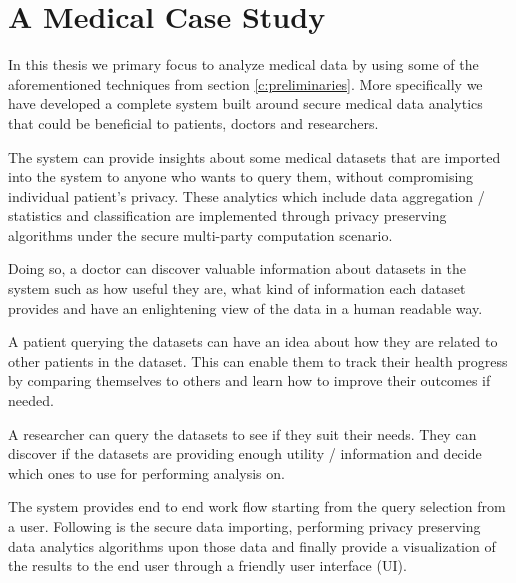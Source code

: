 \chapter{A Medical Case Study}\label{c:medical-study}

In this thesis we primary focus to analyze medical data by using some of the aforementioned techniques from section \ref{c:preliminaries}.
More specifically we have developed a complete system built around secure medical data analytics that could be beneficial to patients, doctors and researchers.

The system can provide insights about some medical datasets that are imported into the system to anyone who wants to query them, without compromising individual patient's privacy.
These analytics which include data aggregation / statistics and classification are implemented through privacy preserving algorithms under the secure multi-party computation scenario.


Doing so, a doctor can discover valuable information about datasets in the system such as how useful they are, what kind of information each dataset provides and have an enlightening view of the data in a human readable way.

A patient querying the datasets can have an idea about how they are related to other patients in the dataset.
This can enable them to track their health progress by comparing themselves to others and learn how to improve their outcomes if needed.

A researcher can query the datasets to see if they suit their needs.
They can discover if the datasets are providing enough utility / information and decide which ones to use for performing analysis on.

The system provides end to end work flow starting from the query selection from a user.
Following is the secure data importing, performing privacy preserving data analytics algorithms upon those data and finally provide a visualization of the results to the end user through a friendly user interface (UI).


